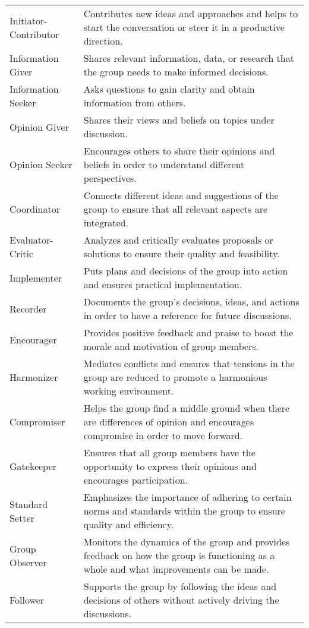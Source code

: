 \begin{table*}[htbp]
\begin{tabularx}{\textwidth}{>{\raggedright\arraybackslash}p{}X}
    Initiator-Contributor & Contributes new ideas and approaches and helps to start the conversation or steer it in a productive direction. \\
    Information Giver & Shares relevant information, data, or research that the group needs to make informed decisions. \\
    Information Seeker & Asks questions to gain clarity and obtain information from others. \\
    Opinion Giver & Shares their views and beliefs on topics under discussion. \\
    Opinion Seeker & Encourages others to share their opinions and beliefs in order to understand different perspectives. \\
    Coordinator & Connects different ideas and suggestions of the group to ensure that all relevant aspects are integrated. \\
    Evaluator-Critic & Analyzes and critically evaluates proposals or solutions to ensure their quality and feasibility. \\
    Implementer & Puts plans and decisions of the group into action and ensures practical implementation. \\
    Recorder & Documents the group's decisions, ideas, and actions in order to have a reference for future discussions. \\
    Encourager & Provides positive feedback and praise to boost the morale and motivation of group members. \\
    Harmonizer & Mediates conflicts and ensures that tensions in the group are reduced to promote a harmonious working environment. \\
    Compromiser & Helps the group find a middle ground when there are differences of opinion and encourages compromise in order to move forward. \\
    Gatekeeper & Ensures that all group members have the opportunity to express their opinions and encourages participation. \\
    Standard Setter & Emphasizes the importance of adhering to certain norms and standards within the group to ensure quality and efficiency. \\
    Group Observer & Monitors the dynamics of the group and provides feedback on how the group is functioning as a whole and what improvements can be made. \\
    Follower & Supports the group by following the ideas and decisions of others without actively driving the discussions. \\


\end{tabularx}
\end{table*}
